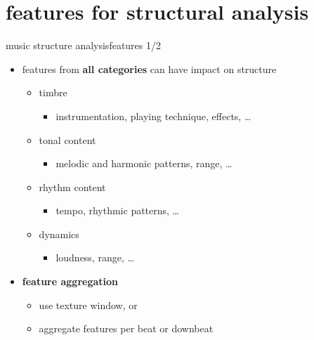     \section[features]{features for structural analysis}
        \begin{frame}{music structure analysis}{features 1/2}
            \begin{itemize}
                \item   features from \textbf{all categories} can have impact on structure
                    \begin{itemize}
                        \item   timbre
                            \begin{itemize}
                                \item   instrumentation, playing technique, effects, \ldots
                            \end{itemize}
                        \item   tonal content
                            \begin{itemize}
                                \item   melodic and harmonic patterns, range, \ldots
                            \end{itemize}
                        \item   rhythm content
                            \begin{itemize}
                                \item   tempo, rhythmic patterns, \ldots
                            \end{itemize}
                        \item   dynamics
                            \begin{itemize}
                                \item   loudness, range, \ldots
                            \end{itemize}
                    \end{itemize}
               \bigskip
               \item<1->    \textbf{feature aggregation}
                \begin{itemize}
                    \item   use texture window, or
                    \item   aggregate features per beat or downbeat
                \end{itemize}
            \end{itemize}
        \end{frame}
